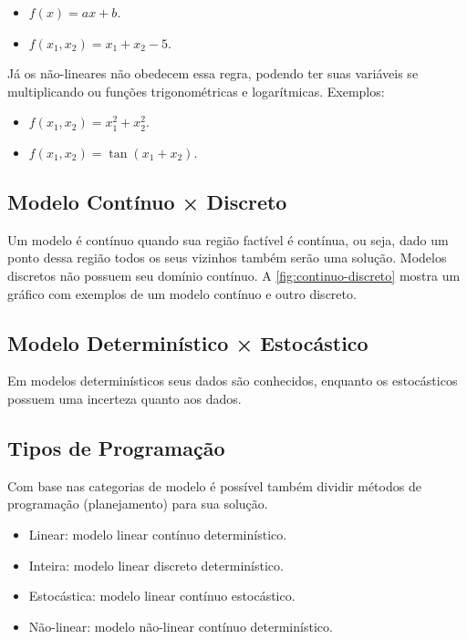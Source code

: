 \begin{itemize}
    \item $f(x) = ax + b$.
    \item $f(x_1, x_2) = x_1 + x_2 - 5$.
\end{itemize}

Já os não-lineares não obedecem essa regra, podendo ter suas variáveis se multiplicando ou funções trigonométricas e logarítmicas.
Exemplos:

\begin{itemize}
    \item $f(x_1, x_2) = x_1^2 + x_2^2$.
    \item $f(x_1, x_2) = \tan(x_1 + x_2)$.
\end{itemize}

\subsection{Modelo Contínuo × Discreto}\label{subsec:modelo-continuo-x-discreto}

Um modelo é contínuo quando sua região factível é contínua, ou seja, dado um ponto dessa região todos os seus vizinhos também serão uma solução.
Modelos discretos não possuem seu domínio contínuo.
A \autoref{fig:continuo-discreto} mostra um gráfico com exemplos de um modelo contínuo e outro discreto.



\subsection{Modelo Determinístico × Estocástico}\label{subsec:modelo-deterministico-x-estocastico}

Em modelos determinísticos seus dados são conhecidos, enquanto os estocásticos possuem uma incerteza quanto aos dados.

\subsection{Tipos de Programação}\label{subsec:tipos-de-programacao}

Com base nas categorias de modelo é possível também dividir métodos de programação (planejamento) para sua solução.

\begin{itemize}
    \item Linear: modelo linear contínuo determinístico.
    \item Inteira: modelo linear discreto determinístico.
    \item Estocástica: modelo linear contínuo estocástico.
    \item Não-linear: modelo não-linear contínuo determinístico.
\end{itemize}


